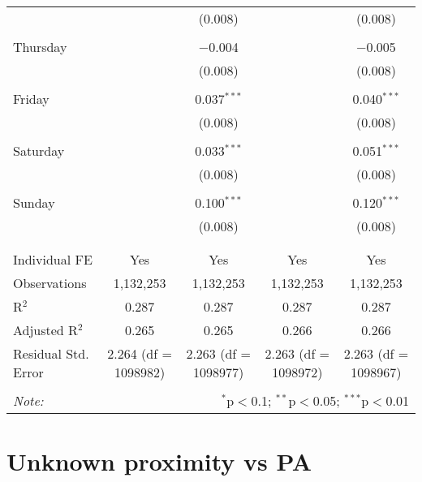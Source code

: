 \documentclass[
]{article}
\begin{document}
\begin{table}[!htbp]
{\begin{tabular}{@{\extracolsep{5pt}}lcccc}
  &  & (0.008) &  & (0.008) \\ 
  & & & & \\ 
 Thursday &  & $-$0.004 &  & $-$0.005 \\ 
  &  & (0.008) &  & (0.008) \\ 
  & & & & \\ 
 Friday &  & 0.037$^{***}$ &  & 0.040$^{***}$ \\ 
  &  & (0.008) &  & (0.008) \\ 
  & & & & \\ 
 Saturday &  & 0.033$^{***}$ &  & 0.051$^{***}$ \\ 
  &  & (0.008) &  & (0.008) \\ 
  & & & & \\ 
 Sunday &  & 0.100$^{***}$ &  & 0.120$^{***}$ \\ 
  &  & (0.008) &  & (0.008) \\ 
  & & & & \\ 
\hline \\[-1.8ex] 
Individual FE & Yes & Yes & Yes & Yes \\ 
Observations & 1,132,253 & 1,132,253 & 1,132,253 & 1,132,253 \\ 
R$^{2}$ & 0.287 & 0.287 & 0.287 & 0.287 \\ 
Adjusted R$^{2}$ & 0.265 & 0.265 & 0.266 & 0.266 \\ 
Residual Std. Error & 2.264 (df = 1098982) & 2.263 (df = 1098977) & 2.263 (df = 1098972) & 2.263 (df = 1098967) \\ 
\hline 
\hline \\[-1.8ex] 
\textit{Note:}  & \multicolumn{4}{r}{$^{*}$p$<$0.1; $^{**}$p$<$0.05; $^{***}$p$<$0.01} \\ 
\end{tabular}
} 
\end{table} 
\newpage
\section{Unknown proximity vs PA}
\end{document}
